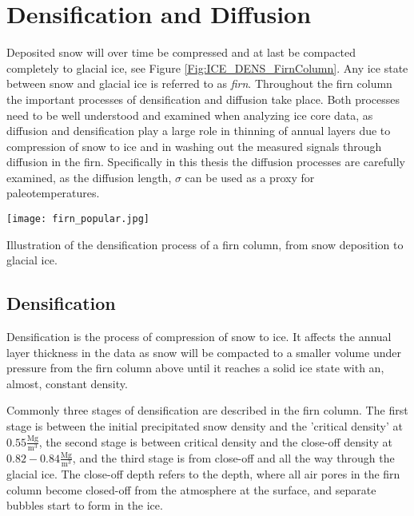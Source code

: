\documentclass[../../CompleteThesis2/Complete_2ndDraft]{subfiles}
\begin{document}


\section[Densification and Diffusion][Densification and Diffusion]{Densification and Diffusion}
\label{Sec:Ice_DensificationAndDiffusion}
Deposited snow will over time be compressed and at last be compacted completely to glacial ice, see Figure \ref{Fig:ICE_DENS_FirnColumn}. Any ice state between snow and glacial ice is referred to as \textit{firn}. Throughout the firn column the important processes of densification and diffusion take place. Both processes need to be well understood and examined when analyzing ice core data, as diffusion and densification play a large role in thinning of annual layers due to compression of snow to ice and in washing out the measured signals through diffusion in the firn. Specifically in this thesis the diffusion processes are carefully examined, as the diffusion length, $\sigma$ can be used as a proxy for paleotemperatures.

\begin{marginfigure}
	\centering
	\texttt{[image: firn\_popular.jpg]}
	\caption[Densification process]{\footnotesize Illustration of the densification process of a firn column, from snow deposition to glacial ice.}
	\label{Fig:ICE_DENS_FirnColumn}
\end{marginfigure}

\subsection[Densification][Densification]{Densification}
\label{Subsec:Ice_DiffusionAndDensification_Densification}
Densification is the process of compression of snow to ice. It affects the annual layer thickness in the data as snow will be compacted to a smaller volume under pressure from the firn column above until it reaches a solid ice state with an, almost, constant density.

Commonly three stages of densification are described in the firn column. The first stage is between the initial precipitated snow density and the 'critical density' at $0.55 \frac{\text{Mg}}{\text{m}^3}$, the second stage is between critical density and the close-off density at $0.82-0.84 \frac{\text{Mg}}{\text{m}^3}$, and the third stage is from close-off and all the way through the glacial ice. The close-off depth refers to the depth, where all air pores in the firn column become closed-off from the atmosphere at the surface, and separate bubbles start to form in the ice.
\end{document}
